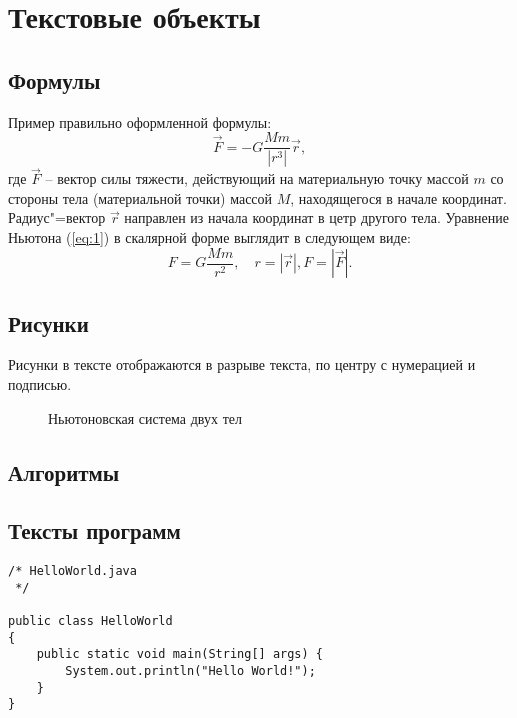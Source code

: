 \documentclass[a4paper,14pt,final]{extreport}
\begin{document}
\section{Текстовые объекты}
\label{sec:objs}

\subsection{Формулы}
\label{sec:formulae}

Пример правильно оформленной формулы:
\begin{equation}
  \label{eq:1}
  \vec{F} = -G\frac{Mm}{|r^3|}\vec{r},
\end{equation}
где $\vec{F}$ -- вектор силы тяжести, действующий на материальную точку массой $m$ со стороны тела (материальной точки) массой $M$, находящегося в начале координат.  Радиус"=вектор $\vec{r}$ направлен из начала координат в цетр другого тела.  Уравнение Ньютона (\ref{eq:1}) в скалярной форме выглядит в следующем виде:
\begin{equation*}
  F=G\frac{Mm}{r^2},\quad r=|\vec{r}|, F=|\vec{F}|.
\end{equation*}

\subsection{Рисунки}
\label{sec:figures}

Рисунки в тексте отображаются в разрыве текста, по центру с нумерацией и подписью.
\begin{figure}[bh]
  \centering
  \def\svgwidth{0.8\linewidth}
  


  \caption{Ньютоновская система двух тел}
  \label{fig:bodies}
\end{figure}


\subsection{Алгоритмы}
\label{sec:algs}

\subsection{Тексты программ}
\label{sec:sources}

\begin{verbatim}
/* HelloWorld.java
 */

public class HelloWorld
{
	public static void main(String[] args) {
		System.out.println("Hello World!");
	}
}
\end{verbatim}
\end{document}
